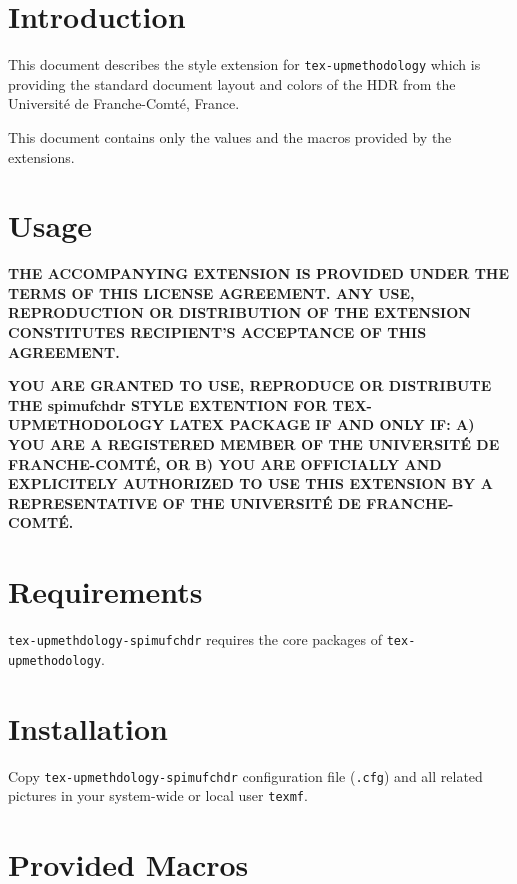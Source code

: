 \documentclass[english]{spimufchdr}
\begin{document}
\section{Introduction}

This document describes the style extension for \texttt{tex-upmethodology} which is providing the standard document layout and colors of the HDR from the Universit\'e de Franche-Comt\'e, France.

This document contains only the values and the macros provided by the extensions.

\section{Usage}

\textbf{THE ACCOMPANYING EXTENSION IS PROVIDED UNDER THE TERMS OF THIS LICENSE AGREEMENT. ANY USE, REPRODUCTION OR DISTRIBUTION OF THE EXTENSION CONSTITUTES RECIPIENT'S ACCEPTANCE OF THIS AGREEMENT.}

\textbf{YOU ARE GRANTED TO USE, REPRODUCE OR DISTRIBUTE THE spimufchdr STYLE EXTENTION FOR TEX-UPMETHODOLOGY LATEX PACKAGE IF AND ONLY IF: A) YOU ARE A REGISTERED MEMBER OF THE UNIVERSIT\'E DE FRANCHE-COMT\'E, OR B) YOU ARE OFFICIALLY AND EXPLICITELY AUTHORIZED TO USE THIS EXTENSION BY A REPRESENTATIVE OF THE UNIVERSIT\'E DE FRANCHE-COMT\'E.}

\section{Requirements}

\texttt{tex-upmethdology-spimufchdr} requires the core packages of \texttt{tex-upmethodology}.

\section{Installation}

Copy \texttt{tex-upmethdology-spimufchdr} configuration file (\texttt{.cfg}) and all related pictures in your system-wide or local user \texttt{texmf}.

\section{Provided Macros}
\end{document}
